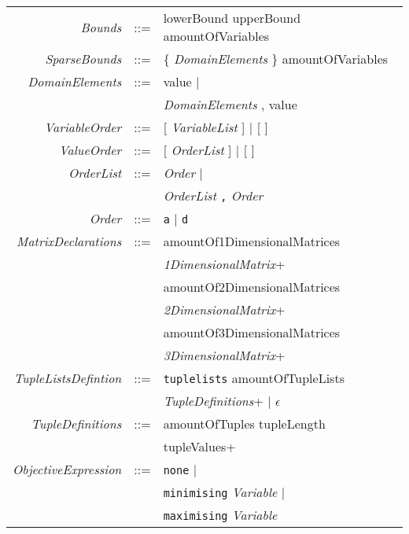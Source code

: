 \documentclass{article}
\begin{document}
\begin{small}
\begin{tabular}{rcl}
 \textit{Bounds}& ::= & lowerBound upperBound amountOfVariables\\ 

 \textit{SparseBounds}& ::= & \{ \textit{DomainElements} \} amountOfVariables \\

\textit{DomainElements}& ::= & value $\mid$ \\
                       &   & \textit{DomainElements} , value \\

\textit{VariableOrder} & ::= & [ \textit{VariableList} ] $\mid$ [ ]\\

\textit{ValueOrder} & ::= & [ \textit{OrderList} ]  $\mid$ [ ]\\

\textit{OrderList} & ::= & \textit{Order} $\mid$ \\
                   &      & \textit{OrderList} \texttt{,} \textit{Order} \\

\textit{Order} &  ::= & \texttt{a}  $\mid$ \texttt{d} \\

\textit{MatrixDeclarations} & ::= & amountOf1DimensionalMatrices \\
                           &     & \textit{1DimensionalMatrix}+ \\
                           &     & amountOf2DimensionalMatrices \\
                           &     & \textit{2DimensionalMatrix}+ \\
                           &     & amountOf3DimensionalMatrices \\
                           &     & \textit{3DimensionalMatrix}+ \\

\textit{TupleListsDefintion}& ::= & \texttt{tuplelists} amountOfTupleLists \\
                            &     & \textit{TupleDefinitions}+ $\mid$ $\epsilon$\\

\textit{TupleDefinitions} & ::= & amountOfTuples tupleLength  \\
                          &     & tupleValues+  \\

\textit{ObjectiveExpression}& ::= & \texttt{none} $\mid$ \\
                            &     & \texttt{minimising} \textit{Variable} $\mid$ \\
                            &     & \texttt{maximising} \textit{Variable} \\


\end{tabular}
\end{small}
\end{document}
